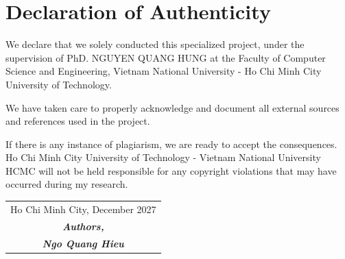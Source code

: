 \chapter*{Declaration of Authenticity}

We declare that we solely conducted this specialized project, under the supervision of PhD. NGUYEN QUANG HUNG at the Faculty of Computer Science and Engineering, Vietnam National University - Ho Chi Minh City University of Technology.

We have taken care to properly acknowledge and document all external sources and references used in the project.

If there is any instance of plagiarism, we are ready to accept the consequences. Ho Chi Minh City University of Technology - Vietnam National University HCMC will not be held responsible for any copyright violations that may have occurred during my research.

\vspace{2cm}

\begin{flushright}
\begin{tabular}{c}
    Ho Chi Minh City, December 2027 \\
    \textit{\textbf{Authors,}} \\
    \textit{\textbf{Ngo Quang Hieu}}

\end{tabular}
\end{flushright}
